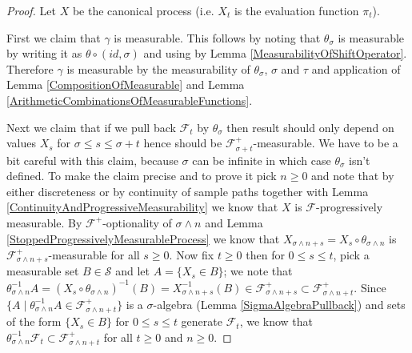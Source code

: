 \begin{proof}
Let $X$ be the canonical process (i.e. $X_t$ is the evaluation
function $\pi_t$).  

First we claim that $\gamma$ is measurable.  This follows by noting
that $\theta_\sigma$ is measurable by writing it as $\theta \circ (id,
\sigma)$ and using by Lemma \ref{MeasurabilityOfShiftOperator}.
Therefore $\gamma$ is measurable by the measurability of
$\theta_\sigma$, $\sigma$
and $\tau$ and application of Lemma \ref{CompositionOfMeasurable} and
Lemma \ref{ArithmeticCombinationsOfMeasurableFunctions}.

Next we claim that if we pull back $\mathcal{F}_t$ by $\theta_\sigma$
then result should only depend on values  $X_s$ for $\sigma \leq s
\leq \sigma + t$ hence should be $\mathcal{F}^+_{\sigma +
  t}$-measurable.  We have to be a bit careful with this claim, because $\sigma$
can be infinite in which case $\theta_\sigma$ isn't defined.  To make
the claim precise and to prove it pick $n \geq 0$ and note that by either discreteness or by continuity of sample
paths together with Lemma
\ref{ContinuityAndProgressiveMeasurability} we know that $X$ is $\mathcal{F}$-progressively measurable. 
By $\mathcal{F}^+$-optionality of $\sigma \wedge n$ and Lemma
\ref{StoppedProgressivelyMeasurableProcess} we know that
$X_{\sigma \wedge n +s} = X_s \circ \theta_{\sigma \wedge n}$ is
$\mathcal{F}^+_{\sigma \wedge n+s}$-measurable for all $s \geq 0$.
Now fix $t \geq 0$ then for $0 \leq s \leq t$, pick a measurable set $B
\in \mathcal{S}$
and let $A = \lbrace X_s \in B \rbrace$; we note that
 $\theta_{\sigma \wedge n}^{-1} A = (X_s \circ \theta_{\sigma \wedge n})^{-1}(B) =
X_{\sigma \wedge n+s}^{-1}(B) \in \mathcal{F}^+_{\sigma \wedge n+s} \subset
\mathcal{F}^+_{\sigma \wedge n+t} $.  
Since $\lbrace A \mid \theta_{\sigma \wedge n}^{-1} A \in
\mathcal{F}^+_{\sigma \wedge n+t} \rbrace$ is a $\sigma$-algebra (Lemma
\ref{SigmaAlgebraPullback}) and sets of the form $\lbrace X_s \in B
\rbrace$ for $0 \leq s \leq t$ generate $\mathcal{F}_t$, we know that
$\theta_{\sigma \wedge n}^{-1} \mathcal{F}_t \subset
\mathcal{F}^+_{\sigma \wedge n +t}$ for all $t \geq 0$ and $n \geq 0$.


\end{proof}

